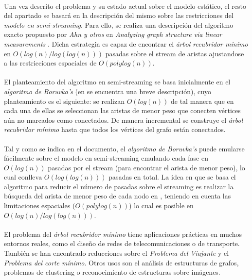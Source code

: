 \documentclass{subfiles}
\begin{document}
        \paragraph{}
        Una vez descrito el problema y su estado actual sobre el modelo estático, el resto del apartado se basará en la descripción del mismo sobre las restricciones del \emph{modelo en semi-streaming}. Para ello, se realiza una descripción del algoritmo exacto propuesto por \emph{Ahn y otros} en \emph{Analyzing graph structure via linear measurements} \cite{ahn2012analyzing}. Dicha estrategia es capaz de encontrar el \emph{árbol recubridor mínimo} en $O(log(n)/log(log(n)))$ pasadas sobre el stream de aristas ajustandose a las restricciones espaciales de $O(polylog(n))$.

        \paragraph{}
        El planteamiento del algoritmo en semi-streaming se basa inicialmente en el \emph{algoritmo de Boruvka’s} (en \cite{wiki:Boruvkas_algorithm} se encuentra una breve descripción), cuyo planteamiento es el siguiente: se realizan $O(log(n))$ de tal manera que en cada una de ellas se seleccionan las aristas de menor peso que conecten vértices aún no marcados como conectados. De manera incremental se construye el \emph{árbol recubridor mínimo} hasta que todos los vértices del grafo están conectados.

        \paragraph{}
        Tal y como se indica en el documento, el \emph{algoritmo de Boruvka’s} puede emularse fácilmente sobre el modelo en semi-streaming emulando cada fase en $O(log(n))$ pasadas por el stream (para encontrar el arista de menor peso), lo cual conlleva $O(log(log(n)))$ pasadas en total. La idea en que se basa el algoritmo para reducir el número de pasadas sobre el streaming es realizar la búsqueda del arista de menor peso de cada nodo en , teniendo en cuenta las limitaciones espaciales ($O(polylog(n))$) lo cual es posible en $O(log(n)/log(log(n)))$.


        \paragraph{}
        El problema del \emph{árbol recubridor mínimo} tiene aplicaciones prácticas en muchos entornos reales, como el diseño de redes de telecomunicaciones o de transporte. También se han encontrado reducciones sobre el \emph{Problema del Viajante} y el \emph{Problema del corte mínimo}. Otros usos son el análisis de estructuras de grafos, problemas de clustering o reconocimiento de estructuras sobre imágenes.
\end{document}
